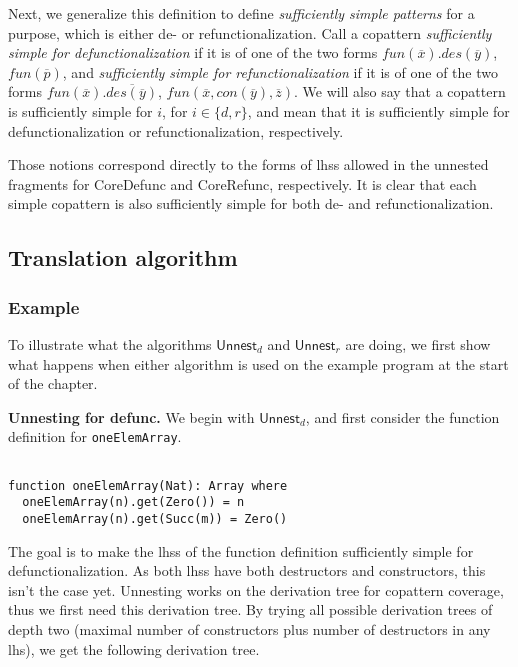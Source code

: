 Next, we generalize this definition to define \textit{sufficiently simple patterns} for a purpose, which is either de- or refunctionalization. Call a copattern \textit{sufficiently simple for defunctionalization} if it is of one of the two forms $fun(\overline{x}).des(\overline{y})$, $fun(\overline{p})$, and \textit{sufficiently simple for refunctionalization} if it is of one of the two forms $fun(\overline{x}).\overline{des(\overline{y})}$, $fun(\overline{x}, con(\overline{y}), \overline{z})$. We will also say that a copattern is sufficiently simple for $i$, for $i \in \{d,r\}$, and mean that it is sufficiently simple for defunctionalization or refunctionalization, respectively.

Those notions correspond directly to the forms of lhss allowed in the unnested fragments for \textsf{CoreDefunc} and \textsf{CoreRefunc}, respectively. It is clear that each simple copattern is also sufficiently simple for both de- and refunctionalization.

\subsection{Translation algorithm}
\label{ssec:unntransl}

\subsubsection{Example}

To illustrate what the algorithms $\textsf{Unnest}_d$ and $\textsf{Unnest}_r$ are doing, we first show what happens when either algorithm is used on the example program at the start of the chapter.

\textbf{Unnesting for defunc.} We begin with $\textsf{Unnest}_d$, and first consider the function definition for \texttt{oneElemArray}.

\begin{lstlisting}

function oneElemArray(Nat): Array where
  oneElemArray(n).get(Zero()) = n
  oneElemArray(n).get(Succ(m)) = Zero()

\end{lstlisting}

The goal is to make the lhss of the function definition sufficiently simple for defunctionalization. As both lhss have both destructors and constructors, this isn't the case yet. Unnesting works on the derivation tree for copattern coverage, thus we first need this derivation tree. By trying all possible derivation trees of depth two (maximal number of constructors plus number of destructors in any lhs), we get the following derivation tree.

